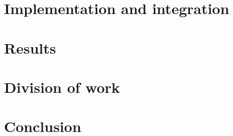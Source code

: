 \documentclass[12pt,a4paper]{article}
\begin{document}
	\section{Implementation and integration}
	
	\section{Results}	
	\section{Division of work}
	
	\section{Conclusion}	
	
\end{document}
